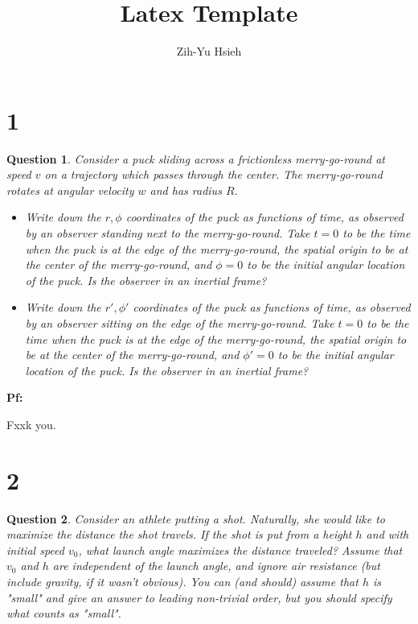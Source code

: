 \documentclass{article}
\title{Latex Template}
\author{Zih-Yu Hsieh}
\newtheorem{question}{Question}
\begin{document}
\maketitle

\section*{1}
\begin{question}\label{q1}
    Consider a puck sliding across a frictionless merry-go-round at speed $v$ on a trajectory which passes through the center. The merry-go-round rotates at angular velocity $w$ and has radius $R$.
    \begin{itemize}
        \item[(a)] Write down the $r,\phi$ coordinates of the puck as functions of time, as observed by an observer standing next to the merry-go-round. Take $t=0$ to be the time when the puck is at the edge of the merry-go-round, the spatial origin to be at the center of the merry-go-round, and $\phi=0$ to be the initial angular location of the puck. Is the observer in an inertial frame?
        \item[(b)] Write down the $r', \phi'$ coordinates of the puck as functions of time, as observed by an observer sitting on the edge of the merry-go-round. Take $t=0$ to be the time when the puck is at the edge of the merry-go-round, the spatial origin to be at the center of the merry-go-round, and $\phi'=0$ to be the initial angular location of the puck. Is the observer in an inertial frame?
    \end{itemize}
\end{question}

\textbf{Pf:}

Fxxk you.

\break

\section*{2}
\begin{question}\label{q2}
    Consider an athlete putting a shot. Naturally, she would like to maximize the distance the shot travels. If the shot is put from a height $h$ and with initial speed $v_0$, what launch angle maximizes the distance traveled? Assume that $v_0$ and $h$ are independent of the launch angle, and ignore air resistance (but include gravity, if it wasn't obvious). You can (and should) assume that $h$ is "small" and give an answer to leading non-trivial order, but you should specify what counts as "small".
\end{question}
\end{document}
